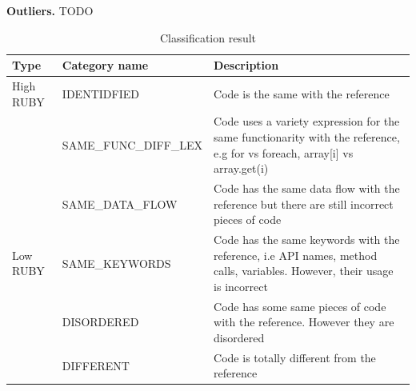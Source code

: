 \textbf{Outliers.} TODO
\begin{table}[]
	\centering
	\caption{Classification result}
	\label{table:Classification_result}
	\begin{tabular}{|m{1cm}|m{3cm}|m{4cm}}
		\hline
		Type      & Category name         & Description                                                                                                                    
		\\
		\hline
		High RUBY & IDENTIDFIED           & Code is the same with the reference                                                                                             \\
		& SAME\_FUNC\_DIFF\_LEX & Code uses a variety expression for the same functionarity with the reference, e.g for vs foreach, array[i] vs array.get(i)\\
		& SAME\_DATA\_FLOW      & Code has the same data flow with the reference but there are still incorrect pieces of code                                     \\
		\hline
		Low RUBY  & SAME\_KEYWORDS        & Code has the same keywords with the reference, i.e API names, method calls, variables. However, their usage is incorrect           \\
		& DISORDERED            & Code has some same pieces of code with the reference. However they are disordered                                               \\
		& DIFFERENT             & Code is totally different from the reference \\
		\hline                                                                                   
	\end{tabular}
\end{table}